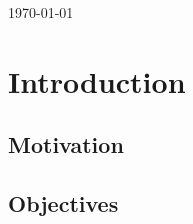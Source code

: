 \documentclass[12pt, a4paper]{report}
\renewcommand{\abstractname}{Abstract}
\newcommand*\NewPage{\newpage\hbox{}\thispagestyle{empty}\newpage}
\begin{document}
\begin{titlepage}


{\large \today}\\[3cm] %




\vfill %
\end{titlepage}
\NewPage


\begin{abstract}
\end{abstract}
\NewPage

\renewcommand{\abstractname}{Acknowledgements}
\begin{abstract}
\end{abstract}
\NewPage

\tableofcontents
\listoffigures
\listoftables
\lstlistoflistings
\todototoc
\listoftodos

\chapter{Introduction}\label{ch:intro}

\section{Motivation}\label{sec:intro-motiv}
\section{Objectives}\label{sec:intro-obj}
\end{document}
